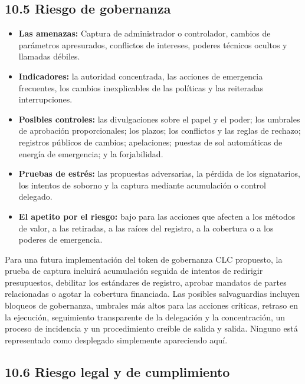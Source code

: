 \documentclass[11pt]{article}
\begin{document}
\subsection*{10.5 Riesgo de gobernanza}

\begin{itemize}[leftmargin=*]
\item \textbf{Las amenazas:} Captura de administrador o controlador, cambios de parámetros apresurados, conflictos de intereses, poderes técnicos ocultos y llamadas débiles.
\item \textbf{Indicadores:} la autoridad concentrada, las acciones de emergencia frecuentes, los cambios inexplicables de las políticas y las reiteradas interrupciones.
\item \textbf{Posibles controles:} las divulgaciones sobre el papel y el poder; los umbrales de aprobación proporcionales; los plazos; los conflictos y las reglas de rechazo; registros públicos de cambios; apelaciones; puestas de sol automáticas de energía de emergencia; y la forjabilidad.
\item \textbf{Pruebas de estrés:} las propuestas adversarias, la pérdida de los signatarios, los intentos de soborno y la captura mediante acumulación o control delegado.
\item \textbf{El apetito por el riesgo:} bajo para las acciones que afecten a los métodos de valor, a las retiradas, a las raíces del registro, a la cobertura o a los poderes de emergencia.
\end{itemize}
Para una futura implementación del token de gobernanza CLC propuesto, la prueba de captura incluirá acumulación seguida de intentos de redirigir presupuestos, debilitar los estándares de registro, aprobar mandatos de partes relacionadas o agotar la cobertura financiada. Las posibles salvaguardias incluyen bloqueos de gobernanza, umbrales más altos para las acciones críticas, retraso en la ejecución, seguimiento transparente de la delegación y la concentración, un proceso de incidencia y un procedimiento creíble de salida y salida. Ninguno está representado como desplegado simplemente apareciendo aquí.

\subsection*{10.6 Riesgo legal y de cumplimiento}
\end{document}
